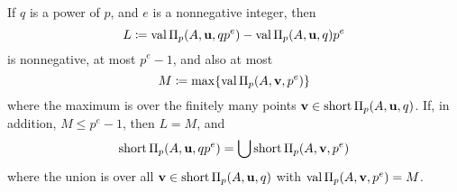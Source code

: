 \documentclass{amsart}
\begin{document}
\begin{theorem}
\label{general AIP: T}
If $q$ is a power of $p$, and $e$ is a nonnegative integer, then
\[  L \coloneqq \operatorname{val} \Pi_p(A, \mathbf{u}, qp^e) -  \operatorname{val} \Pi_p(A, \mathbf{u}, q)p^e  \]
is nonnegative, at most $p^e-1$, and also at most
\[ M \coloneqq \max \{ \operatorname{val} \Pi_p(A, \mathbf{v}, p^e)  \}\]
where the maximum is over the finitely many points $\mathbf{v} \in \operatorname{short} \Pi_p(A, \mathbf{u}, q)$.
If, in addition, $M \le p^e-1$,  then $L=M$, and
\[  \operatorname{short} \Pi_p(A, \mathbf{u}, qp^e) = \bigcup \operatorname{short} \Pi_p(A, \mathbf{v}, p^e)\]
where the union is over all $\mathbf{v} \in \operatorname{short} \Pi_p(A, \mathbf{u}, q)$ with $\operatorname{val} \Pi_p(A,\mathbf{v},p^e) = M$.
\end{theorem}
\end{document}
